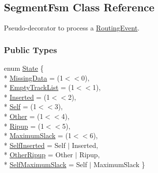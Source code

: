\hypertarget{classKite_1_1SegmentFsm}{\subsection{Segment\-Fsm Class Reference}
\label{classKite_1_1SegmentFsm}
}


Pseudo-\/decorator to process a \hyperlink{classKite_1_1RoutingEvent}{Routing\-Event}.  


\subsubsection*{Public Types}
\begin{DoxyCompactItemize}
\item 
enum \hyperlink{classKite_1_1SegmentFsm_a5d74787dedbc4e11c1ab15bf487e61f8}{State} \{ \\*
\hyperlink{classKite_1_1SegmentFsm_a5d74787dedbc4e11c1ab15bf487e61f8a79ae4f26b8ed9c55b81f981bb5076e1d}{Missing\-Data} = (1$<$$<$0), 
\\*
\hyperlink{classKite_1_1SegmentFsm_a5d74787dedbc4e11c1ab15bf487e61f8a13ac7e0722ca806ff25d8fa9220e980b}{Empty\-Track\-List} = (1$<$$<$1), 
\\*
\hyperlink{classKite_1_1SegmentFsm_a5d74787dedbc4e11c1ab15bf487e61f8abb9adb1672565a2d0c2de07ea840414e}{Inserted} = (1$<$$<$2), 
\\*
\hyperlink{classKite_1_1SegmentFsm_a5d74787dedbc4e11c1ab15bf487e61f8aacd3ef9d889b306ca7e7bdcd37ba659a}{Self} = (1$<$$<$3), 
\\*
\hyperlink{classKite_1_1SegmentFsm_a5d74787dedbc4e11c1ab15bf487e61f8a75f0c3176be2226dfe8ad164a0a034a2}{Other} = (1$<$$<$4), 
\\*
\hyperlink{classKite_1_1SegmentFsm_a5d74787dedbc4e11c1ab15bf487e61f8a08900dc237aef7e4a7f50d2ba1ffd748}{Ripup} = (1$<$$<$5), 
\\*
\hyperlink{classKite_1_1SegmentFsm_a5d74787dedbc4e11c1ab15bf487e61f8a9fc7197613f3435d906edf69a73acf38}{Maximum\-Slack} = (1$<$$<$6), 
\\*
\hyperlink{classKite_1_1SegmentFsm_a5d74787dedbc4e11c1ab15bf487e61f8a8c564779c81599aaadbe879fa2b08d92}{Self\-Inserted} = Self $|$ Inserted, 
\\*
\hyperlink{classKite_1_1SegmentFsm_a5d74787dedbc4e11c1ab15bf487e61f8a22374bab829fac7d12af4784d80eeb6e}{Other\-Ripup} = Other $|$ Ripup, 
\\*
\hyperlink{classKite_1_1SegmentFsm_a5d74787dedbc4e11c1ab15bf487e61f8a560766bb79539564fdeda432c8efae6d}{Self\-Maximum\-Slack} = Self $|$ Maximum\-Slack
 \}
\end{DoxyCompactItemize}
